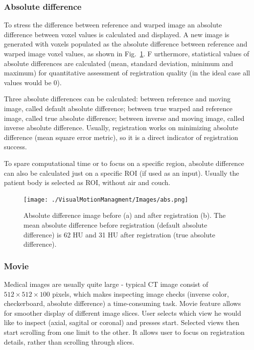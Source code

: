 \subsubsection{Absolute difference}
\label{sec:absDiff}

To stress the difference between reference and warped image an absolute difference between voxel values is calculated and displayed. 
A new image is generated with voxels populated as the absolute difference between reference and warped image voxel values, as shown in Fig.~\ref{absDiff}. F
urthermore, statistical values of absolute differences are calculated (mean, standard deviation, minimum and maximum) 
for quantitative assessment of registration quality (in the ideal case all values would be 0).

Three absolute differences can be calculated: between reference and moving image, called default absolute difference; between true warped and reference image, called true absolute difference; between inverse and moving image, called
inverse absolute difference. Usually, registration works on minimizing absolute difference (mean square error metric), so it is a direct indicator
of registration success.

To spare computational time or to focus on a specific region, absolute difference can also be calculated just on a specific ROI (if used as an input). Usually the patient body is selected as ROI, without air and couch.


\begin{figure}[H]
	\begin{center}		
		\texttt{[image: ./VisualMotionManagment/Images/abs.png]}
		\caption{Absolute difference image before (a) and after registration (b). The mean absolute difference before registration (default absolute difference) is 62 HU and 31 HU after registration (true absolute difference).}
		\label{absDiff}
	\end{center}
\end{figure}

\subsubsection{Movie}

Medical images are usually quite large - typical CT image consist of $512 \times 512 \times 100$ pixels, which makes inspecting image checks (inverse color, checkerboard, absolute difference) a time-consuming task. Movie feature allows for smoother display of different image slices. User selects which view he would like to inspect (axial, sagital or coronal) and presses start. Selected views then start scrolling from one limit to the other. It allows user to focus on registration details, rather than scrolling through slices.

